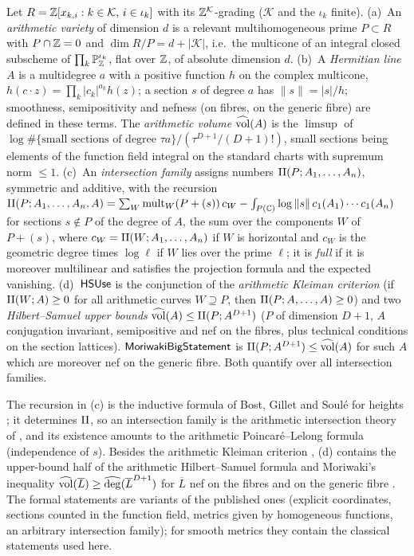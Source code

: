\begin{definition}\label{def:covolume:hs}
Let $R=\mathbb{Z}[x_{k,i}:k\in\mathcal K,\,i\in\iota_k]$ with its $\mathbb{Z}^{\mathcal K}$-grading ($\mathcal K$ and the
$\iota_k$ finite).
(a)~An \emph{arithmetic variety} of dimension $d$ is a relevant multihomogeneous prime $P\subset R$ with
$P\cap\mathbb{Z}=0$ and $\dim R/P=d+|\mathcal K|$, i.e.\ the multicone of an integral closed subscheme of
$\prod_k\mathbb P^{\iota_k}_{\mathbb{Z}}$, flat over $\mathbb{Z}$, of absolute dimension $d$.
(b)~A \emph{Hermitian line} $A$ is a multidegree $a$ with a positive function $h$ on the complex
multicone, $h(c\cdot z)=\prod_k|c_k|^{a_k}h(z)$; a section $s$ of degree $a$ has $\|s\|=|s|/h$;
smoothness, semipositivity and nefness (on fibres, on the generic fibre) are defined in these terms.
The \emph{arithmetic volume} $\widehat{\operatorname{vol}}(A)$ is the $\limsup$ of
$\log\#\{\text{small sections of degree }\tau a\}/(\tau^{D+1}/(D+1)!)$, small sections being elements of
the function field integral on the standard charts with supremum norm $\le1$.
(c)~An \emph{intersection family} assigns numbers $\mathrm{II}(P;A_1,\dots,A_n)$, symmetric and additive,
with the recursion
$\mathrm{II}(P;A_1,\dots,A_n,A)=\sum_W\mathrm{mult}_W(P+(s))\,c_W-\int_{P(\mathbb{C})}\log\|s\|\,c_1(A_1)\cdots c_1(A_n)$
for sections $s\notin P$ of the degree of $A$, the sum over the components $W$ of $P+(s)$, where
$c_W=\mathrm{II}(W;A_1,\dots,A_n)$ if $W$ is horizontal and $c_W$ is the geometric degree times $\log\ell$
if $W$ lies over the prime $\ell$; it is \emph{full} if it is moreover multilinear and satisfies the
projection formula and the expected vanishing.
(d)~$\mathsf{HSUse}$ is the conjunction of the \emph{arithmetic Kleiman criterion} (if $\mathrm{II}(W;A)\ge0$
for all arithmetic curves $W\supseteq P$, then $\mathrm{II}(P;A,\dots,A)\ge0$) and two \emph{Hilbert--Samuel
upper bounds} $\widehat{\operatorname{vol}}(A)\le\mathrm{II}(P;A^{D+1})$ ($P$ of dimension $D+1$, $A$ conjugation
invariant, semipositive and nef on the fibres, plus technical conditions on the section lattices).
$\mathsf{MoriwakiBigStatement}$ is
$\mathrm{II}(P;A^{D+1})\le\widehat{\operatorname{vol}}(A)$ for such $A$ which are moreover nef on the generic fibre.
Both quantify over all intersection families.
\end{definition}

The recursion in (c) is the inductive formula of Bost, Gillet and Soul\'e for heights
\cite{BostGilletSoule1994}; it determines $\mathrm{II}$, so an intersection family is the arithmetic
intersection theory of \cite{GilletSoule1990,BostGilletSoule1994}, and its existence amounts to the
arithmetic Poincar\'e--Lelong formula (independence of $s$). Besides the arithmetic Kleiman criterion
\cite{Zhang1995,Moriwaki2009}, (d) contains the upper-bound half of the arithmetic Hilbert--Samuel formula
\cite{GilletSoule1992,AbbesBouche1995,Zhang1995} and Moriwaki's inequality
$\widehat{\operatorname{vol}}(\overline L)\ge\widehat{\operatorname{deg}}(\overline L^{D+1})$ for $\overline L$ nef on the fibres and on the
generic fibre \cite{Moriwaki2009,Yuan2008}. The formal statements are variants of the published ones
(explicit coordinates, sections counted in the function field, metrics given by homogeneous functions,
an arbitrary intersection family); for smooth metrics they contain the classical statements used here.

